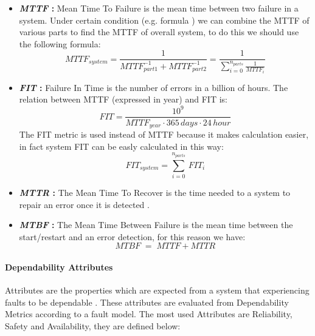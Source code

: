 {{{{\begin{itemize}
					\item \textbf{\textit{MTTF} : } Mean Time To Failure is the mean time between two failure in a system. Under certain condition (e.g. formula ) we can combine the MTTF of various parts to find the MTTF of overall system, to do this we should use the following formula:
					\begin{equation}
						MTTF_{system} = \dfrac{1}{MTTF_{part1}^{-1} + MTTF_{part2}^{-1}} = \dfrac{1}{\sum\limits_{i=0}^{n_{parts}}\frac{1}{MTTF_i}}
					\end{equation} 		
					
					\item \textbf{\textit{FIT} : } Failure In Time is the number of errors in a billion of hours. The relation between MTTF (expressed in year) and FIT is:
					\begin{equation}
					FIT = \dfrac{10^9}{MTTF_{year}\cdot 365 \,days\cdot 24\,hour}
					\end{equation} 
					The FIT metric is used instead of MTTF because it makes calculation easier, in fact system FIT can be easly calculated in this way:
					\begin{equation}
					FIT_{system} = \sum_{i=0}^{n_{parts}}\,FIT_i
					\end{equation}
					
					\item \textbf{\textit{MTTR} : } The Mean Time To Recover is the time needed to a system to repair an error once it is detected  .
					
					\item \textbf{\textit{MTBF} : } The Mean Time Between Failure is the mean time between the start/restart and an error detection, for this reason we have:
					\begin{equation}
						MTBF\;=\;MTTF+MTTR
					\end{equation}
				\end{itemize} 
			} %
			\paragraph{Dependability Attributes}{
				Attributes are the properties which are expected from a system that experiencing faults to be dependable . These attributes are evaluated from Dependability Metrics according to a fault model. The most used Attributes are Reliability, Safety and Availability, they are defined below: 
				\begin{itemize}
					

\end{itemize}}}}}
